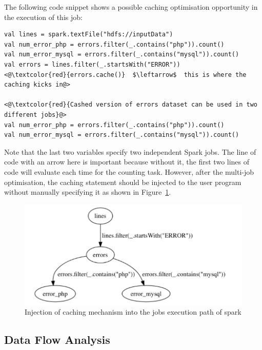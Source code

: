 \documentclass[conference]{sig-alternate-05-2015}
\begin{document}
The following code snippet shows a possible caching optimisation opportunity in the execution of this job:

\begin{lstlisting}[frame=single, caption=Possible Caching Example, label=code:example, breaklines=true]
val lines = spark.textFile("hdfs://inputData")
val num_error_php = errors.filter(_.contains("php")).count()
val num_error_mysql = errors.filter(_.contains("mysql")).count()
val errors = lines.filter(_.startsWith("ERROR"))
<@\textcolor{red}{errors.cache()}  $\leftarrow$  this is where the caching kicks in@>

<@\textcolor{red}{Cashed version of errors dataset can be used in two different jobs}@>
val num_error_php = errors.filter(_.contains("php")).count()
val num_error_mysql = errors.filter(_.contains("mysql")).count()
\end{lstlisting}

Note that the last two variables specify two independent Spark jobs. The line of code with an arrow here is important because without it, the first two lines of code will evaluate each time for the counting task. However, after the multi-job optimisation, the caching statement should be injected to the user program without manually specifying it as shown in Figure~\ref{fig:example}.

\begin{figure}[htbp]
	\centering
		\includegraphics[width=0.95\columnwidth]{images/1.JPEG}
	\caption{Injection of caching mechanism into the jobs execution path of spark}
\label{fig:example}
\end{figure}

\subsection{Data Flow Analysis}
\end{document}
